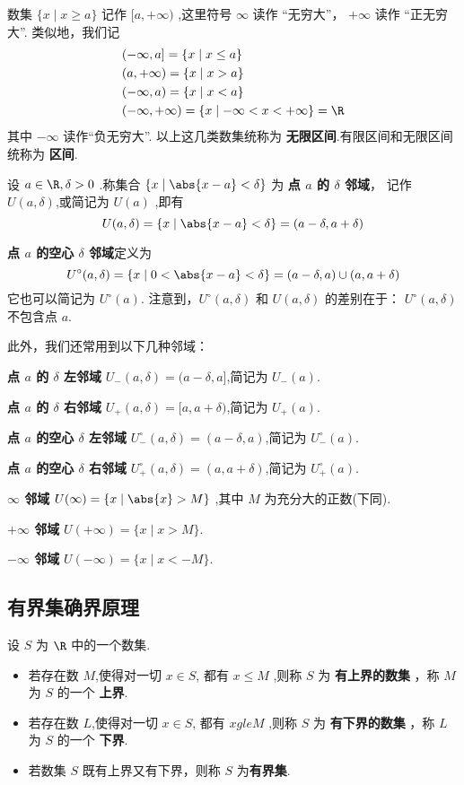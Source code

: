 数集 $\{x\mid x\ge a\}$ 记作 $[a,+\infty)$ ,这里符号 $\infty$ 读作 “无穷大”， $+\infty$ 读作 “正无穷大”. 类似地，我们记
\begin{align*}
    &(-\infty,a] = \{x \mid x \le a\} \\
    &(a,+\infty) = \{x \mid x > a\} \\
    &(-\infty,a) = \{x \mid x < a\} \\
    &(-\infty,+\infty) = \{x \mid -\infty < x < +\infty\} = \R
\end{align*}
其中 $-\infty$ 读作“负无穷大”. 以上这几类数集统称为 \textbf{无限区间}.有限区间和无限区间统称为 \textbf{区间}.

设 $a\in \R,\delta>0$ .称集合 $\{x \mid \abs{x-a}<\delta\}$ 为 \textbf{点 $a$ 的 $\delta$ 邻域}， 记作 $U(a,\delta)$,或简记为 $U(a)$ ,即有
\[
U(a,\delta) = \{x \mid \abs{x-a}<\delta\} = (a-\delta,a+\delta)
\]

\textbf{点 $a$ 的空心 $\delta$ 邻域}定义为 
\[
U^\circ(a,\delta) = \{x \mid 0< \abs{x-a}<\delta\} = (a-\delta,a) \cup (a,a+\delta)
\]
它也可以简记为 $U^\circ(a)$. 注意到，$U^\circ(a,\delta)$ 和 $U(a,\delta)$ 的差别在于： $U^\circ(a,\delta)$ 不包含点 $a$.

此外，我们还常用到以下几种邻域：

\textbf{点 $a$ 的 $\delta$ 左邻域} $U_-(a,\delta)=(a-\delta,a]$,简记为 $U_-(a)$.

\textbf{点 $a$ 的 $\delta$ 右邻域} $U_+(a,\delta)=[a,a+\delta)$,简记为 $U_+(a)$.

\textbf{点 $a$ 的空心 $\delta$ 左邻域} $U^\circ_-(a,\delta)=(a-\delta,a)$,简记为 $U^\circ_-(a)$.

\textbf{点 $a$ 的空心 $\delta$ 右邻域} $U^\circ_+(a,\delta)=(a,a+\delta)$,简记为 $U^\circ_+(a)$.

\textbf{$\infty$ 邻域} $U(\infty)=\{x \mid \abs{x}>M\}$ ,其中 $M$ 为充分大的正数(下同).

\textbf{$+\infty$ 邻域} $U(+\infty)=\{x \mid x>M\}$.

\textbf{$-\infty$ 邻域} $U(-\infty)=\{x \mid x<-M\}$.

\subsection{有界集\textbullet 确界原理}

\begin{definition}[有界数集]
    设 $S$ 为 $\R$ 中的一个数集. 
    \begin{itemize}
        \item 若存在数 $M$,使得对一切 $x\in S$, 都有 $x \le M$ ,则称 $S$ 为 \textbf{有上界的数集} ，称 $M$ 为 $S$ 的一个 \textbf{上界}.
        \item 若存在数 $L$,使得对一切 $x\in S$, 都有 $x gle M$ ,则称 $S$ 为 \textbf{有下界的数集} ，称 $L$ 为 $S$ 的一个 \textbf{下界}. 
        \item 若数集 $S$ 既有上界又有下界，则称 $S$ 为\textbf{有界集}.
    \end{itemize}
\end{definition}

